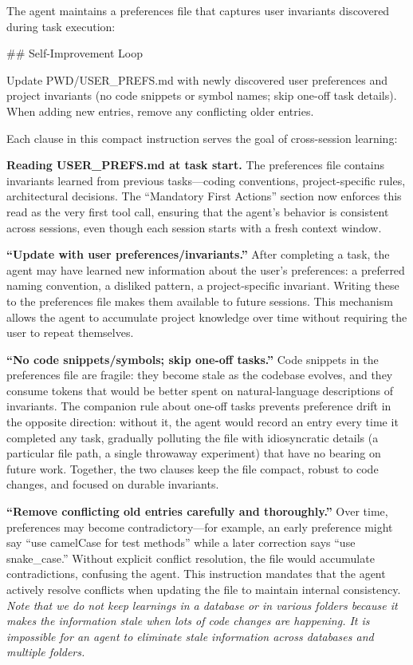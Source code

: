 \documentclass{article}
\begin{document}
The agent maintains a preferences file that captures user invariants discovered during task execution:

\begin{prompt}
## Self-Improvement Loop

Update PWD/USER_PREFS.md with newly discovered user
preferences and project invariants (no code snippets
or symbol names; skip one-off task details). When
adding new entries, remove any conflicting older
entries.
\end{prompt}

\noindent Each clause in this compact instruction serves the goal of cross-session learning:

\textbf{Reading USER\_PREFS.md at task start.}  The preferences file contains invariants learned from previous tasks---coding conventions, project-specific rules, architectural decisions.  The ``Mandatory First Actions'' section now enforces this read as the very first tool call, ensuring that the agent's behavior is consistent across sessions, even though each session starts with a fresh context window.

\textbf{``Update with user preferences/invariants.''}  After completing a task, the agent may have learned new information about the user's preferences: a preferred naming convention, a disliked pattern, a project-specific invariant.  Writing these to the preferences file makes them available to future sessions.  This mechanism allows the agent to accumulate project knowledge over time without requiring the user to repeat themselves.

\textbf{``No code snippets/symbols; skip one-off tasks.''}  Code snippets in the preferences file are fragile: they become stale as the codebase evolves, and they consume tokens that would be better spent on natural-language descriptions of invariants.  The companion rule about one-off tasks prevents preference drift in the opposite direction: without it, the agent would record an entry every time it completed any task, gradually polluting the file with idiosyncratic details (a particular file path, a single throwaway experiment) that have no bearing on future work.  Together, the two clauses keep the file compact, robust to code changes, and focused on durable invariants.

\textbf{``Remove conflicting old entries carefully and thoroughly.''}  Over time, preferences may become contradictory---for example, an early preference might say ``use camelCase for test methods'' while a later correction says ``use snake\_case.'' Without explicit conflict resolution, the file would accumulate contradictions, confusing the agent.  This instruction mandates that the agent actively resolve conflicts when updating the file to maintain internal consistency.  \emph{Note that we do not keep learnings in a database or in various folders because it makes the information stale when lots of code changes are happening.  It is impossible for an agent to eliminate stale information across databases and multiple folders.}
\end{document}
